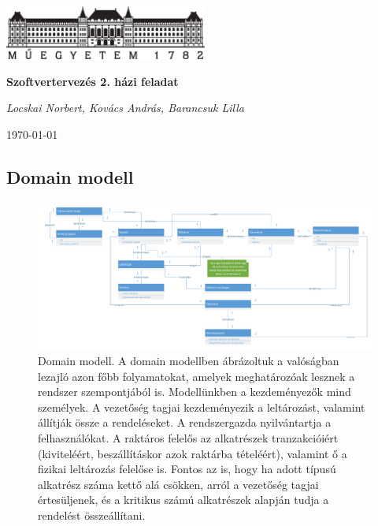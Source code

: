 \documentclass[12pt]{article}\usepackage[left=20mm,right=20mm,top=20mm,bottom=20mm]{geometry}
\begin{document}
\begin{titlepage}
\centering
	\includegraphics[width=0.5\textwidth]{figures/bme_logo_kicsi.eps}\par\vspace{1cm}
	\vspace{1cm}
	\vspace{1.5cm}
	{\huge\bfseries Szoftvertervezés 2. házi feladat \par}
	\vspace{15cm}
	{\huge\itshape Locskai Norbert, Kovács András, Barancsuk Lilla \par}
	\vfill

	{\large \today\par}
\end{titlepage}

\thispagestyle{empty}
\begin{landscape}
\section{Domain modell}
\begin{figure}[!h]
    \centering
        \includegraphics[width=1.4\textwidth]{kepek/Domain_model.pdf}
        \caption{Domain modell. A domain modellben ábrázoltuk a valóságban lezajló azon főbb folyamatokat, amelyek meghatározóak lesznek a rendszer szempontjából is. Modellünkben a kezdeményezők mind személyek.
A vezetőség tagjai kezdeményezik a leltározást, valamint állítják össze a rendeléseket.
A rendszergazda nyilvántartja a felhasználókat.
A raktáros felelős az alkatrészek tranzakcióiért (kiviteléért, beszállításkor azok raktárba tételéért), valamint ő a fizikai leltározás felelőse is. 
Fontos az is, hogy ha adott típusú alkatrész száma kettő alá csökken, arról a vezetőség tagjai értesüljenek, és a kritikus számú alkatrészek alapján tudja a rendelést összeállítani.}
\end{figure}
\end{landscape}
\end{document}
